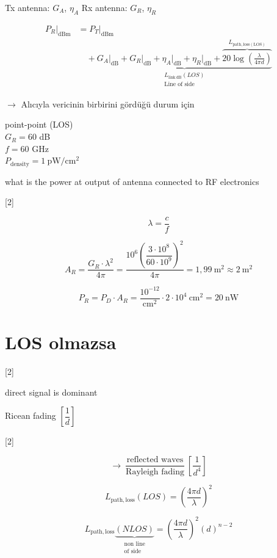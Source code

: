 \documentclass[11pt,a4paper]{article}
\begin{document}
Tx antenna: $G_A$, $\eta_A$ \qquad Rx antenna: $G_R$, $\eta_R$

\begin{align*}
P_R\big|_{\mathrm{dBm}} &= P_T\big|_{\mathrm{dBm}} \\
&\quad + \underbrace{G_A\big|_{\mathrm{dB}} + G_R\big|_{\mathrm{dB}} + \eta_A\big|_{\mathrm{dB}} + \eta_R\big|_{\mathrm{dB}} + \overbrace{20\log\left(\frac{\lambda}{4\pi d}\right)}^{L_{\mathrm{path,loss(LOS)}}}}_{\substack{L_{\mathrm{link\,dB}}(LOS)\\ \text{Line of side}}}
\end{align*}

$\rightarrow$ Alıcıyla vericinin birbirini gördüğü durum için

\begin{ornek}
point-point (LOS) \\
$G_R = 60$ dB \\
$f = 60$ GHz \\
$P_{\mathrm{density}} = 1\ \mathrm{pW/cm^2}$

what is the power at output of antenna connected to RF electronics

[2]
\end{ornek}

\[ \lambda = \frac{c}{f} \]

\[ A_R = \frac{G_R\cdot\lambda^2}{4\pi} = \frac{10^6\left(\dfrac{3\cdot 10^8}{60\cdot 10^9}\right)^2}{4\pi} = 1{,}99\ \mathrm{m^2} \approx 2\ \mathrm{m^2} \]

\[ P_R = P_D\cdot A_R = \frac{10^{-12}}{\mathrm{cm^2}}\cdot 2\cdot 10^4\ \mathrm{cm^2} = 20\ \mathrm{nW} \]

\section{LOS olmazsa}

[2]

direct signal is dominant

Ricean fading $\left[\dfrac{1}{d}\right]$

[2]

\[ \rightarrow\ \frac{\text{reflected waves}}{\text{Rayleigh fading}}\ \left[\frac{1}{d^4}\right] \]

\[ L_{\mathrm{path,loss}}(LOS) = \left(\frac{4\pi d}{\lambda}\right)^2 \]

\[ L_{\mathrm{path,loss}}\underbrace{(NLOS)}_{\substack{\text{non line}\\ \text{of side}}} = \left(\frac{4\pi d}{\lambda}\right)^2 (d)^{n-2} \]
\end{document}
